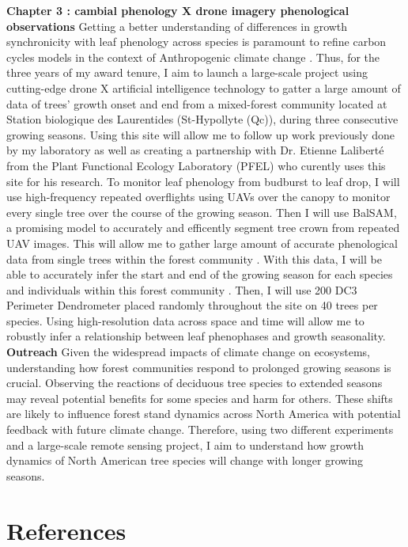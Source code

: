 \documentclass[12pt]{article}
\begin{document}
\textbf{Chapter 3 : cambial phenology X drone imagery phenological observations}
Getting a better understanding of differences in growth synchronicity with leaf phenology across species is paramount to refine carbon cycles models in the context of Anthropogenic climate change \citep{klein_coordination_2016,kramer_importance_2000,richardson_climate_2013,swidrak_comparing_2013}. Thus, for the three years of my award tenure, I aim to launch a large-scale project using cutting-edge drone X artificial intelligence technology \citep{ball_accurate_2023,teng_bringing_2025,ulku_deep_2022} to gatter a large amount of data of trees' growth onset and end from a mixed-forest community located at Station biologique des Laurentides (St-Hypollyte (Qc)), during three consecutive growing seasons. Using this site will allow me to follow up work previously done by my laboratory as well as creating a partnership with Dr. Etienne Laliberté from the Plant Functional Ecology Laboratory (PFEL) who curently uses this site for his research. To monitor leaf phenology from budburst to leaf drop, I will use high-frequency repeated overflights using UAVs over the canopy to monitor every single tree over the course of the growing season. Then I will use BalSAM, a promising model to accurately and efficently segment tree crown from repeated UAV images. This will allow me to gather large amount of accurate phenological data from single trees within the forest community \citep{teng_bringing_2025}. With this data, I will be able to accurately infer the start and end of the growing season for each species and individuals within this forest community \citep{berra_assessing_2019,fawcett_monitoring_2021}. Then, I will use 200 DC3 Perimeter Dendrometer placed randomly throughout the site on 40 trees per species. Using high-resolution data across space and time will allow me to robustly infer a relationship between leaf phenophases and growth seasonality.\\


\textbf{Outreach}
Given the widespread impacts of climate change on ecosystems, understanding how forest communities respond to prolonged growing seasons is crucial. Observing the reactions of deciduous tree species to extended seasons may reveal potential benefits for some species and harm for others. These shifts are likely to influence forest stand dynamics across North America with potential feedback with future climate change. Therefore, using two different experiments and a large-scale remote sensing project, I aim to understand how growth dynamics of North American tree species will change with longer growing seasons.  

\section*{References}

\end{document}
